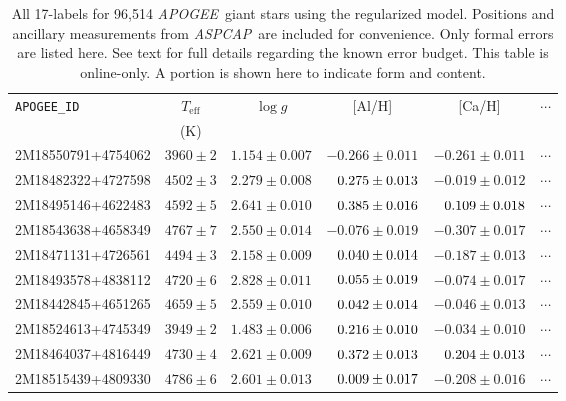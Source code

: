 \documentclass[12pt,preprint]{aastex}
\newcommand{\project}[1]{\textsl{#1}}
\newcommand{\acronym}[1]{{\small{#1}}}
\newcommand{\apogee}{\project{\acronym{APOGEE}}}
\newcommand{\aspcap}{\project{\acronym{ASPCAP}}}
\newcommand{\logg}{\log g}
\newcommand{\Teff}{T_{\mathrm{eff}}}
\newcommand{\pn}{\hphantom{-}}
\begin{document}
\begin{table}
\centering
\begin{tabular}{lccccc}
\hline
\texttt{APOGEE\_ID} & $\Teff$ & $\logg$ & [Al/H] & [Ca/H] & $\cdots$ \\
& (K) & & & \\
\hline
2M18550791+4754062 & $3960 \pm 2$ & $1.154 \pm 0.007$ & $-0.266   \pm 0.011$ & $-0.261   \pm 0.011$ & $\cdots$ \\
2M18482322+4727598 & $4502 \pm 3$ & $2.279 \pm 0.008$ & $\pn0.275 \pm 0.013$ & $-0.019   \pm 0.012$ & $\cdots$ \\
2M18495146+4622483 & $4592 \pm 5$ & $2.641 \pm 0.010$ & $\pn0.385 \pm 0.016$ & $\pn0.109 \pm 0.018$ & $\cdots$ \\
2M18543638+4658349 & $4767 \pm 7$ & $2.550 \pm 0.014$ & $-0.076   \pm 0.019$ & $-0.307   \pm 0.017$ & $\cdots$ \\
2M18471131+4726561 & $4494 \pm 3$ & $2.158 \pm 0.009$ & $\pn0.040 \pm 0.014$ & $-0.187   \pm 0.013$ & $\cdots$ \\
2M18493578+4838112 & $4720 \pm 6$ & $2.828 \pm 0.011$ & $\pn0.055 \pm 0.019$ & $-0.074   \pm 0.017$ & $\cdots$ \\
2M18442845+4651265 & $4659 \pm 5$ & $2.559 \pm 0.010$ & $\pn0.042 \pm 0.014$ & $-0.046   \pm 0.013$ & $\cdots$ \\
2M18524613+4745349 & $3949 \pm 2$ & $1.483 \pm 0.006$ & $\pn0.216 \pm 0.010$ & $-0.034   \pm 0.010$ & $\cdots$ \\
2M18464037+4816449 & $4730 \pm 4$ & $2.621 \pm 0.009$ & $\pn0.372 \pm 0.013$ & $\pn0.204 \pm 0.013$ & $\cdots$ \\
2M18515439+4809330 & $4786 \pm 6$ & $2.601 \pm 0.013$ & $\pn0.009 \pm 0.017$ & $-0.208   \pm 0.016$ & $\cdots$ \\
\hline
\end{tabular}
\caption{All 17-labels for 96,514 \apogee\ giant stars using the regularized model. Positions and ancillary measurements from \aspcap\ are included for convenience. Only formal errors are listed here. See text for full details regarding the known error budget.  This table is online-only. A portion is shown here to indicate form and content.}
\label{tab:the-good-stuff}
\end{table}
\end{document}
